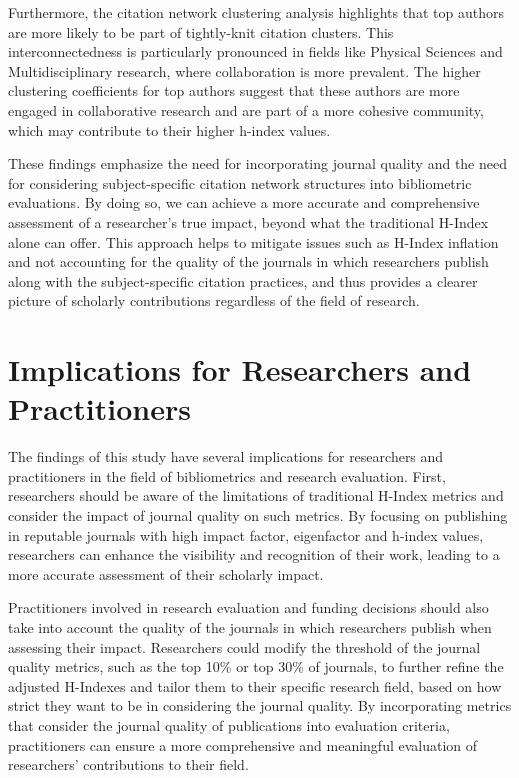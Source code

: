 Furthermore, the citation network clustering analysis highlights that top
authors are more likely to be part of tightly-knit citation clusters. This
interconnectedness is particularly pronounced in fields like Physical Sciences and
Multidisciplinary research, where collaboration is more prevalent. The higher
clustering coefficients for top authors suggest that these authors are more
engaged in collaborative research and are part of a more cohesive
community, which may contribute to their higher h-index values.

These findings emphasize the need for incorporating journal quality and the
need for considering subject-specific citation network structures into
bibliometric evaluations. By doing so, we can achieve a more accurate and
comprehensive assessment of a researcher's true impact, beyond what the
traditional H-Index alone can offer. This approach helps to mitigate issues
such as H-Index inflation and not accounting for the quality of the journals in
which researchers publish along with the subject-specific citation practices,
and thus provides a clearer picture of scholarly contributions regardless of
the field of research.

\section{Implications for Researchers and Practitioners}

The findings of this study have several implications for researchers and
practitioners in the field of bibliometrics and research evaluation. First,
researchers should be aware of the limitations of traditional H-Index metrics
and consider the impact of journal quality on such metrics. By focusing on
publishing in reputable journals with high impact factor, eigenfactor and h-index values,
researchers can enhance the visibility and recognition of their work, leading
to a more accurate assessment of their scholarly impact. 

Practitioners involved in research evaluation and funding decisions should also
take into account the quality of the journals in which researchers publish when
assessing their impact. Researchers could
modify the threshold of the journal quality metrics, such as the top 10\% or
top 30\% of journals, to further refine the adjusted H-Indexes and tailor them
to their specific research field, based on how strict they want to be in
considering the journal quality. By incorporating metrics that consider the journal quality of publications into
evaluation criteria, practitioners can ensure a more comprehensive and
meaningful evaluation of researchers' contributions to their field.

